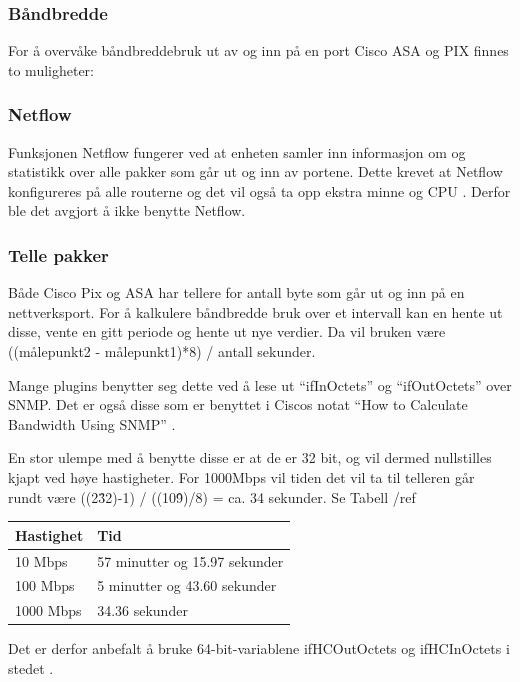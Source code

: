 \subsubsection{Båndbredde}

For å overvåke båndbreddebruk ut av og inn på en port Cisco ASA og PIX finnes to muligheter:

\subsubsection{Netflow}

Funksjonen Netflow \cite{ciscoiosnetflow} fungerer ved at enheten samler inn informasjon om og statistikk over alle pakker som går ut og inn av portene. Dette krevet at Netflow konfigureres på alle routerne og det vil også ta opp ekstra minne og CPU \cite{cisconetflowperf}. Derfor ble det avgjort å ikke benytte Netflow.

\subsubsection{Telle pakker}

Både Cisco Pix og ASA har tellere for antall byte som går ut og inn på en nettverksport. For å kalkulere båndbredde bruk over et intervall kan en hente ut disse, vente en gitt periode og hente ut nye verdier. Da vil bruken være ((målepunkt2 - målepunkt1)*8) / antall sekunder.

Mange plugins benytter seg dette ved å lese ut “ifInOctets” og “ifOutOctets” over SNMP. Det er også disse som er benyttet i Ciscos notat “How to Calculate Bandwidth Using SNMP” \cite{ciscobandwidth}. 

En stor ulempe med å benytte disse er at de er 32 bit, og vil dermed nullstilles kjapt ved høye hastigheter. For 1000Mbps vil tiden det vil ta til telleren går rundt være ((2\^32)-1) / ((10\^9)/8) = ca. 34 sekunder. Se Tabell /ref 
\begin{table}
\begin{center}
\begin{tabular}{ | l | p{7cm} |} 
        \textbf{Hastighet} & \textbf{Tid}
	\\ \hline
        10 Mbps & 57 minutter og 15.97 sekunder \\ \hline  
        100 Mbps & 5 minutter og 43.60 sekunder \\ \hline
	1000 Mbps & 34.36 sekunder \\ 
	\hline
\end{tabular}
\label{kalkulering_teller}
\end{center}
\end{table}
Det er derfor anbefalt å bruke 64-bit-variablene ifHCOutOctets og ifHCInOctets i stedet \cite{ciscosnmpcounters}.

